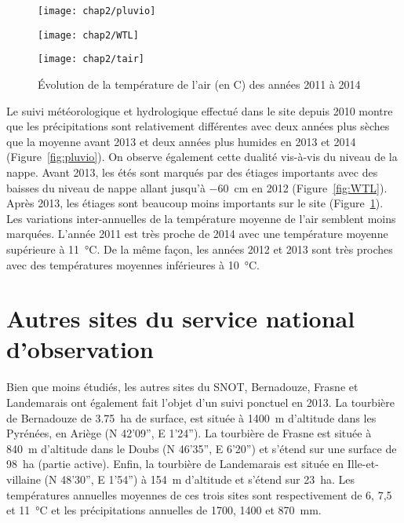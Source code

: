 \begin{figure}
\centering
\texttt{[image: chap2/pluvio]}\\
\caption{Évolution du niveau de la pluviométrie, en \si{\mm}, des années 2011 à 2014}
\label{fig:pluvio}
\texttt{[image: chap2/WTL]}\\
\caption{Évolution du niveau de la nappe, en cm par rapport à la surface, des années 2011 à 2014}
\label{fig:WTL}
\texttt{[image: chap2/tair]}
\caption{Évolution de la température de l'air (en \textdegree C) des années 2011 à 2014}
\label{fig:tair}
\end{figure}

Le suivi météorologique et hydrologique effectué dans le site depuis 2010 montre que les précipitations sont relativement différentes avec deux années plus sèches que la moyenne avant 2013 et deux années plus humides en 2013 et 2014 (Figure~\ref{fig:pluvio}).
On observe également cette dualité vis-à-vis du niveau de la nappe.
Avant 2013, les étés sont marqués par des étiages importants avec des baisses du niveau de nappe allant jusqu'à \SI{-60}{\cm} en 2012 (Figure~\ref{fig:WTL}).
Après 2013, les étiages sont beaucoup moins importants sur le site (Figure~\ref{fig:tair}).
Les variations inter-annuelles de la température moyenne de l'air semblent moins marquées.
L'année 2011 est très proche de 2014 avec une température moyenne supérieure à \SI{11}{\degreeCelsius}.
De la même façon, les années 2012 et 2013 sont très proches avec des températures moyennes inférieures à  \SI{10}{\degreeCelsius}.


\singlespacing
\section{Autres sites du service national d'observation}
\doublespacing

Bien que moins étudiés, les autres sites du SNOT, Bernadouze, Frasne et Landemarais ont également fait l'objet d'un suivi ponctuel en 2013.
La tourbière de Bernadouze de \SI{3.75}{\hectare} de surface, est située à \SI{1400}{\metre} d'altitude dans les Pyrénées, en Ariège (N 42’09”, E 1’24”).
La tourbière de Frasne est située à \SI{840}{\metre} d'altitude dans le Doubs (N 46’35”, E 6’20”) et s'étend sur une surface de \SI{98}{\hectare} (partie active).
Enfin, la tourbière de Landemarais est située en Ille-et-villaine (N 48’30”, E 1’54”) à \SI{154}{\metre} d'altitude et s'étend sur \SI{23}{\hectare}.
Les températures annuelles moyennes de ces trois sites sont respectivement de 6, 7,5 et \SI{11}{\degreeCelsius} et les précipitations annuelles de \num{1700}, \num{1400} et \SI{870}{\milli\meter}.

